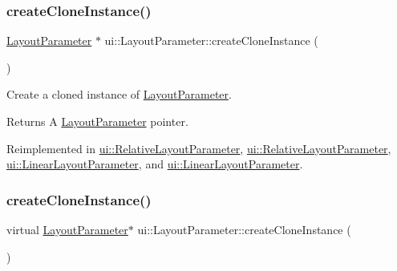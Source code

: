 \subsubsection{\texorpdfstring{create\+Clone\+Instance()}{createCloneInstance()}\hspace{0.1cm}{\footnotesize\ttfamily [1/2]}}
{\footnotesize\ttfamily \hyperlink{classui_1_1LayoutParameter}{Layout\+Parameter} $\ast$ ui\+::\+Layout\+Parameter\+::create\+Clone\+Instance (\begin{DoxyParamCaption}{ }\end{DoxyParamCaption})\hspace{0.3cm}{\ttfamily [virtual]}}

Create a cloned instance of \hyperlink{classui_1_1LayoutParameter}{Layout\+Parameter}. \begin{DoxyReturn}{Returns}
A \hyperlink{classui_1_1LayoutParameter}{Layout\+Parameter} pointer. 
\end{DoxyReturn}


Reimplemented in \hyperlink{classui_1_1RelativeLayoutParameter_ad3da385d6428bced2722a6308ce685f4}{ui\+::\+Relative\+Layout\+Parameter}, \hyperlink{classui_1_1RelativeLayoutParameter_ac9b09ffad77d413122c56c06c230c4c7}{ui\+::\+Relative\+Layout\+Parameter}, \hyperlink{classui_1_1LinearLayoutParameter_a90adfb888afd28d7ee8974f5a32afe35}{ui\+::\+Linear\+Layout\+Parameter}, and \hyperlink{classui_1_1LinearLayoutParameter_a5f48d9a8e9acb1bea23e15723a3c405a}{ui\+::\+Linear\+Layout\+Parameter}.

\mbox{\label{classui_1_1LayoutParameter_a7b047d7ab5306ad9f49e2b065ffcee7a}} 
\subsubsection{\texorpdfstring{create\+Clone\+Instance()}{createCloneInstance()}\hspace{0.1cm}{\footnotesize\ttfamily [2/2]}}
{\footnotesize\ttfamily virtual \hyperlink{classui_1_1LayoutParameter}{Layout\+Parameter}$\ast$ ui\+::\+Layout\+Parameter\+::create\+Clone\+Instance (\begin{DoxyParamCaption}{ }\end{DoxyParamCaption})\hspace{0.3cm}{\ttfamily [virtual]}}

